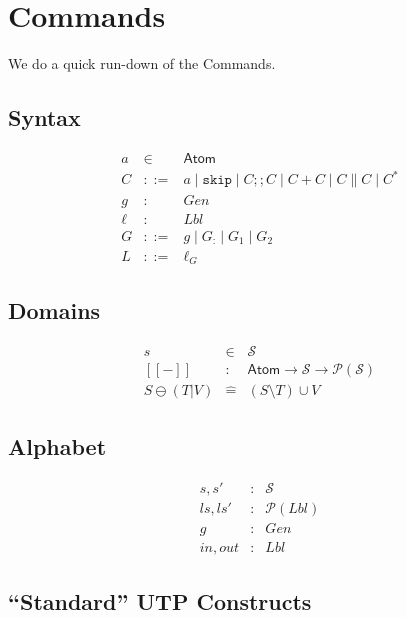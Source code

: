 \section{Commands}

\def\Atom{\textsf{Atom}}
\def\cskip{\texttt{skip}}
\def\cseq{\mathbin{;\!;}}
\def\semlbr{[\![}
\def\semrbr{]\!]}
\def\sem#1{\semlbr{#1}\semrbr}
\def\fun{\rightarrow}
\def\defs{\widehat=}
\def\cond#1{\mathrel{\lhd{#1}\rhd}}
\def\Skip{I\!I}
\def\W{\mathbf{W}}

We do a quick run-down of the Commands\cite{conf/popl/Dinsdale-YoungBGPY13}.

\subsection{Syntax}

\begin{eqnarray*}
   a &\in& \Atom
\\ C &::=& a \mid \cskip \mid C \cseq C \mid C+C \mid C \parallel C \mid C^*
\\ g &:& Gen
\\ \ell &:& Lbl
\\ G &::=&  g \mid G_{:} \mid G_1 \mid G_2
\\ L &::=& \ell_G
\end{eqnarray*}

\subsection{Domains} 
\begin{eqnarray*}
   s &\in& \mathcal S
\\ \sem{-} &:& \Atom \fun \mathcal S \fun \mathcal P(\mathcal S)
\\ S \ominus (T|V) 
   &\defs& (S \setminus T) \cup V
\end{eqnarray*}

\subsection{Alphabet}

\begin{eqnarray*}
   s, s' &:& \mathcal S
\\ ls, ls' &:& \mathcal P (Lbl)
\\ g &:& Gen
\\ in, out &:& Lbl
\end{eqnarray*} 
\subsection{``Standard'' UTP Constructs}

